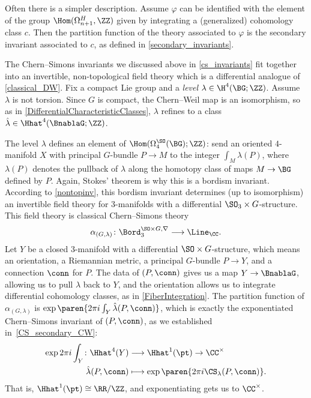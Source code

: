 Often there is a simpler description. Assume $\varphi$ can be identified with the element of the group $\Hom(\Omega_{n+1}^H,
\ZZ)$ given by integrating a (generalized) cohomology class $c$. Then the partition function of the theory
associated to $\varphi$ is the secondary invariant associated to $c$, as defined in \cref{secondary_invariants}.
\begin{example}
\label{classical_CS}
The Chern--Simons invariants we discussed above in \cref{cs_invariants} fit together into an invertible,
non-topological field theory which is a differential analogue of \cref{classical_DW}. Fix a compact Lie group and a
\textit{level} $\lambda\in\H^4(\BG;\ZZ)$. Assume $\lambda$ is not torsion. Since $G$ is compact, the Chern--Weil map
is an isomorphism, so as in \cref{DifferentialCharacteristicClasses}, $\lambda$ refines to a class
$\hat \lambda\in \Hhat^4(\BnablaG;\ZZ)$.

The level $\lambda$ defines an element of $\Hom(\Omega_4^{\SO}(\BG);\ZZ)$: send an oriented $4$-manifold $X$ with
principal $G$-bundle $P\to M$ to the integer $\int_M \lambda(P)$, where $\lambda(P)$ denotes the pullback of
$\lambda$ along the homotopy class of maps $M\to \BG$ defined by $P$. Again, Stokes' theorem is why this is a
bordism invariant. According to \cref{nontopinv}, this bordism invariant determines (up to isomorphism) an
invertible field theory for $3$-manifolds with a differential $\SO_3\times G$-structure. This field theory is
classical Chern--Simons theory \cite{Fre95, Fre02, Gom01}
\begin{equation}
	\alpha_{(G, \lambda)}\colon\Bord_3^{\SO\times G, \nabla}\longrightarrow \Line_\CC.
\end{equation}
Let $Y$ be a closed $3$-manifold with a differential $\SO\times G$-structure, which means an orientation, a
Riemannian metric, a principal $G$-bundle $P\to Y$, and a connection $\conn$ for $P$. The data of $(P,\conn)$
gives us a map $Y\to\BnablaG$, allowing us to pull $\hat \lambda$ back to $Y$, and the orientation allows us to
integrate differential cohomology classes, as in \cref{FiberIntegration}. The
partition function of $\alpha_{(G, \lambda)}$ is $\exp\paren{2\pi i \int_Y \hat \lambda(P, \conn)}$, which is
exactly the exponentiated Chern--Simons invariant of $(P, \conn)$, as we established in~\eqref{CS_secondary_CW}:
\begin{equation}
\begin{aligned}
	\exp2\pi i\int_Y\colon \Hhat^4(Y) &\longrightarrow \Hhat^1(\pt)\to \CC^\times\\
	\hat \lambda(P, \conn) &\longmapsto \exp\paren{2\pi i\CS_\lambda(P, \conn)}.
\end{aligned}
\end{equation}
That is, $\Hhat^1(\pt)\cong\RR/\ZZ$, and exponentiating gets us to $\CC^\times$.


\end{example}
